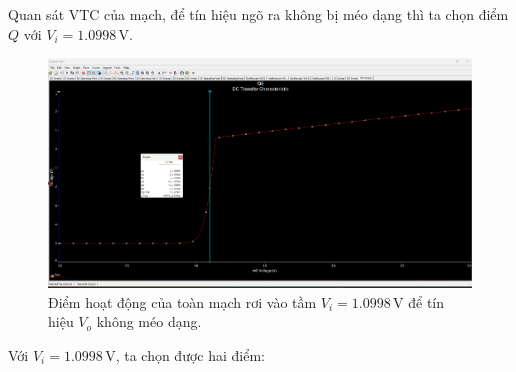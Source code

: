 
Quan sát VTC của mạch, để tín hiệu ngõ ra không bị méo dạng thì ta chọn điểm $Q$ với $V_{i} = 1.0998\,\text{V}$.

\begin{figure}[H]
	\centering
	\includegraphics[width=.9\linewidth]{./my-chapters/my-images/Question5/b_Q_tong.png}
	\caption{Điểm hoạt động của toàn mạch rơi vào tầm $V_{i} = 1.0998\,\text{V}$ để tín hiệu $V_{o}$ không méo dạng.}
\end{figure}

Với $V_{i} = 1.0998\,\text{V}$, ta chọn được hai điểm:


